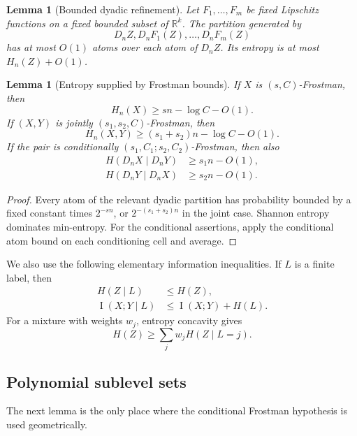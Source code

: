 \documentclass[11pt]{article}
\newtheorem{lemma}[theorem]{Lemma}
\begin{document}
\begin{lemma}[Bounded dyadic refinement]
\label{lem:bounded-refinement}
Let \(F_1,\ldots,F_m\) be fixed Lipschitz functions on a fixed
bounded subset of \(\mathbb R^k\).  The partition generated by
\[
 D_nZ,D_nF_1(Z),\ldots,D_nF_m(Z)
\]
has at most \(O(1)\) atoms over each atom of \(D_nZ\).  Its entropy
is at most \(H_n(Z)+O(1)\).
\end{lemma}

\begin{lemma}[Entropy supplied by Frostman bounds]
\label{lem:Frostman-entropy}
If \(X\) is \((s,C)\)-Frostman, then
\[
 H_n(X)\ge sn-\log C-O(1).
\]
If \((X,Y)\) is jointly \((s_1,s_2,C)\)-Frostman, then
\[
 H_n(X,Y)\ge(s_1+s_2)n-\log C-O(1).
\]
If the pair is conditionally
\((s_1,C_1;s_2,C_2)\)-Frostman, then also
\begin{align*}
 H(D_nX\mid D_nY)&\ge s_1n-O(1),\\
 H(D_nY\mid D_nX)&\ge s_2n-O(1).
\end{align*}
\end{lemma}

\begin{proof}
Every atom of the relevant dyadic partition has probability bounded
by a fixed constant times \(2^{-sn}\), or
\(2^{-(s_1+s_2)n}\) in the joint case.  Shannon entropy dominates
min-entropy.  For the conditional assertions, apply the conditional
atom bound on each conditioning cell and average.
\end{proof}

We also use the following elementary information inequalities.  If
\(L\) is a finite label, then
\begin{align}
 H(Z\mid L)&\le H(Z),
 \label{eq:label-entropy}\\
 \operatorname{I}(X;Y\mid L)&\le \operatorname{I}(X;Y)+H(L).
 \label{eq:label-MI}
\end{align}
For a mixture with weights \(w_j\), entropy concavity gives
\begin{equation}
 H(Z)\ge\sum_jw_jH(Z\mid L=j).
 \label{eq:mixture-concavity}
\end{equation}

\subsection{Polynomial sublevel sets}

The next lemma is the only place where the conditional Frostman
hypothesis is used geometrically.
\end{document}
